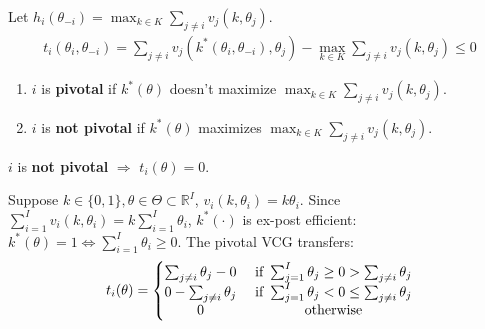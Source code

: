 \documentclass[11pt]{elegantbook_2}
\begin{document}
\begin{definition}
    Let $h_i(\theta_{-i})=\max_{k\in K}\sum_{j\neq i}v_j(k,\theta_j)$.
    \begin{equation}
        \begin{aligned}
            t_i(\theta_i,\theta_{-i})=\sum_{j\neq i}v_j(k^*(\theta_i,\theta_{-i}),\theta_j)-\max_{k\in K}\sum_{j\neq i}v_j(k,\theta_j)\leq 0
        \end{aligned}
        \nonumber
    \end{equation}
    \begin{enumerate}
        \item $i$ is \textbf{pivotal} if $k^*(\theta)$ doesn't maximize $\max_{k\in K}\sum_{j\neq i}v_j(k,\theta_j)$.
        \item $i$ is \textbf{not pivotal} if $k^*(\theta)$ maximizes $\max_{k\in K}\sum_{j\neq i}v_j(k,\theta_j)$.
    \end{enumerate}
    \begin{note}
        $i$ is \textbf{not pivotal} $\Rightarrow$ $t_i(\theta)=0$.
    \end{note}
\end{definition}

\begin{example}
    Suppose $k\in\{0,1\}, \theta\in \Theta\subset \mathbb{R}^I$, $v_i(k,\theta_i)=k\theta_i$. Since $\sum_{i=1}^Iv_i(k,\theta_i)=k\sum_{i=1}^I\theta_i$, $k^*(\cdot)$ is ex-post efficient: $k^*(\theta)=1 \Leftrightarrow \sum_{i=1}^I\theta_i\geq 0$. The pivotal VCG transfers:
    \begin{equation}
        \begin{aligned}
            t_i(\theta)=\left\{\begin{matrix}
                \sum_{j\neq i}\theta_j-0&\textnormal{ if }\sum_{j=1}^I \theta_j\geq 0>\sum_{j\neq i}\theta_j\\
                0-\sum_{j\neq i}\theta_j&\textnormal{ if }\sum_{j=1}^I \theta_j< 0\leq\sum_{j\neq i}\theta_j\\
                0&\textnormal{ otherwise}
            \end{matrix}\right.
        \end{aligned}
        \nonumber
    \end{equation}
\end{example}
\end{document}
